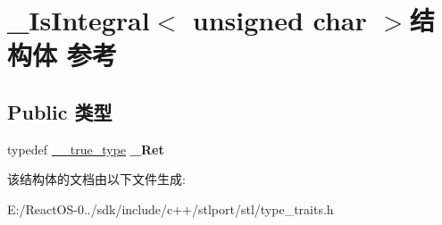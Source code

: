 \hypertarget{struct___is_integral_3_01unsigned_01char_01_4}{}\section{\+\_\+\+Is\+Integral$<$ unsigned char $>$结构体 参考}
\label{struct___is_integral_3_01unsigned_01char_01_4}
\subsection*{Public 类型}
\begin{DoxyCompactItemize}
\item 
\mbox{\label{struct___is_integral_3_01unsigned_01char_01_4_ad1847f2d586fb5a8914a8a5f3a8b75ca}} 
typedef \hyperlink{struct____true__type}{\+\_\+\+\_\+true\+\_\+type} {\bfseries \+\_\+\+Ret}
\end{DoxyCompactItemize}


该结构体的文档由以下文件生成\+:\begin{DoxyCompactItemize}
\item 
E\+:/\+React\+O\+S-\/0../sdk/include/c++/stlport/stl/type\+\_\+traits.\+h\end{DoxyCompactItemize}
